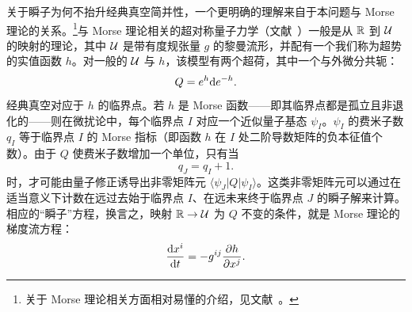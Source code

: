 关于瞬子为何不抬升经典真空简并性，一个更明确的理解来自于本问题与 Morse 理论的关系。\footnote{关于 Morse 理论相关方面相对易懂的介绍，见文献~\cite{hutchings}。}与 Morse 理论相关的超对称量子力学（文献~\cite{Morse}）一般是从 ${\mathbb R}$ 到 ${\mathcal U}$ 的映射的理论，其中 ${\mathcal U}$ 是带有度规张量 $g$ 的黎曼流形，并配有一个我们称为超势的实值函数 $h$。对一般的 ${\mathcal U}$ 与 $h$，该模型有两个超荷，其中一个与外微分共轭：
\begin{equation}\label{zolmo} Q=e^h{\mathrm d} e^{-h}.\end{equation}
经典真空对应于 $h$ 的临界点。若 $h$ 是 Morse 函数——即其临界点都是孤立且非退化的——则在微扰论中，每个临界点 $I$ 对应一个近似量子基态 $\psi_I$。$\psi_I$ 的费米子数 $q_I$ 等于临界点 $I$ 的 Morse 指标（即函数 $h$ 在 $I$ 处二阶导数矩阵的负本征值个数）。由于 $Q$ 使费米子数增加一个单位，只有当
\begin{equation}\label{yre} q_J=q_I+1.\end{equation}
时，才可能由量子修正诱导出非零矩阵元 $\langle \psi_J|Q|\psi_I\rangle$。这类非零矩阵元可以通过在适当意义下计数在远过去始于临界点 $I$、在远未来终于临界点 $J$ 的瞬子解来计算。相应的“瞬子”方程，换言之，映射 ${\mathbb R}\to {\mathcal U}$ 为 $Q$ 不变的条件，就是 Morse 理论的梯度流方程：
\begin{equation}\label{orlox} \frac{{\mathrm d} x^i}{{\mathrm d} t}=-g^{ij}\frac{\partial h}{\partial x^j}.\end{equation}

